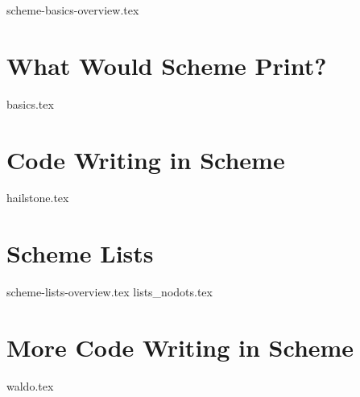 \documentclass{exam}
\begin{document}
{scheme-basics-overview.tex}
\begin{questions}
\newpage
\section{What Would Scheme Print?}
{basics.tex}

\section{Code Writing in Scheme}
{hailstone.tex}

\section{Scheme Lists}
{scheme-lists-overview.tex}
\newpage
{lists_nodots.tex}

\section{More Code Writing in Scheme}
{waldo.tex}
\end{questions}
\end{document}
